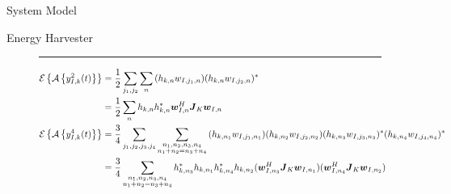\documentclass{IEEEtran}
\begin{document}
\begin{section}{System Model}
\begin{subsection}{Energy Harvester}
		\begin{figure*}[b]
			\hrule
			\begin{align}
				\mathcal{E}\left\{\mathcal{A}\left\{y_{I,k}^2(t)\right\}\right\}
				 & =\frac{1}{2}\sum_{j_1,j_2}\sum_n{(h_{k,n}w_{I,j_1,n})(h_{k,n}w_{I,j_2,n})^*}\label{eq:E{A{y_{I,k}**2}}}                                                                                                                                                                        \\
				 & =\frac{1}{2}\sum_n{h_{k,n}h_{k,n}^*{\boldsymbol{w}_{I,n}^H}{\boldsymbol{J}_{K}}{\boldsymbol{w}_{I,n}}}                                                                                                                                                                         \\
				\mathcal{E}\left\{\mathcal{A}\left\{y_{I,k}^4(t)\right\}\right\}
				 & =\frac{3}{4}\sum_{j_1,j_2,j_3,j_4}\sum_{\substack{{n_1},{n_2},{n_3},{n_4}\\{n_1}+{n_2}={n_3}+{n_4}}}{(h_{k,{n_1}}w_{I,{j_1},{n_1}})(h_{k,{n_2}}w_{I,{j_2},{n_2}})(h_{k,{n_3}}w_{I,{j_3},{n_3}})^*(h_{k,{n_4}}w_{I,{j_4},{n_4}})^*}                       \\
				 & =\frac{3}{4}\sum_{\substack{{n_1},{n_2},{n_3},{n_4}\\{n_1}+{n_2}={n_3}+{n_4}}}{h_{k,n_3}^*h_{k,n_1}h_{k,n_4}^*h_{k,n_2}(\boldsymbol{w}_{I,n_3}^H\boldsymbol{J}_K\boldsymbol{w}_{I,n_1})(\boldsymbol{w}_{I,n_4}^H\boldsymbol{J}_K\boldsymbol{w}_{I,n_2})} \\

\end{align}
\end{figure*}
\end{subsection}
\end{section}
\end{document}

